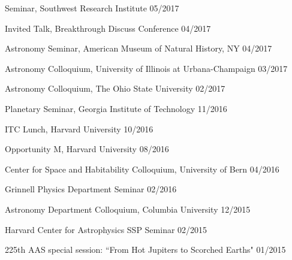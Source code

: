 \documentclass[12pt,letterpaper]{article}
\begin{document}
\begin{list}{}{\cvlist}
\item {Seminar, Southwest Research Institute \hfill 05/2017}
\item {Invited Talk, Breakthrough Discuss Conference \hfill 04/2017}
\item {Astronomy Seminar, American Museum of Natural History, NY \hfill 04/2017}
\item {Astronomy Colloquium, University of Illinois at Urbana-Champaign \hfill 03/2017}
\item {Astronomy Colloquium, The Ohio State University \hfill 02/2017}
\item {Planetary Seminar, Georgia Institute of Technology \hfill 11/2016}
\item {ITC Lunch, Harvard University \hfill 10/2016}
\item {Opportunity M, Harvard University \hfill 08/2016}
\item {Center for Space and Habitability Colloquium, University of Bern \hfill 04/2016}
\item {Grinnell Physics Department Seminar \hfill 02/2016}
\item {Astronomy Department Colloquium, Columbia University \hfill 12/2015}
\item {Harvard Center for Astrophysics SSP Seminar \hfill 02/2015}
\item {225th AAS special session: ``From Hot Jupiters to Scorched Earths" \hfill 01/2015}

\end{list}
\end{document}
